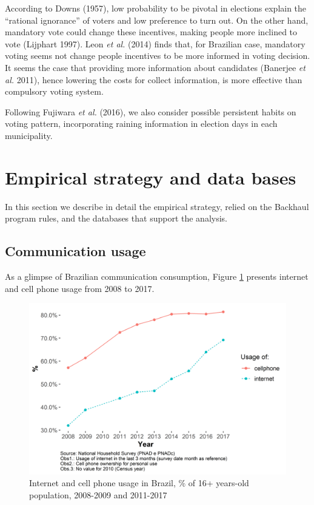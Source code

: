\documentclass[
  12pt,
]{article}
\begin{document}
According to Downs (1957), low probability to be pivotal in elections
explain the ``rational ignorance'' of voters and low preference to turn
out. On the other hand, mandatory vote could change these incentives,
making people more inclined to vote (Lijphart 1997). Leon \emph{et al.}
(2014) finds that, for Brazilian case, mandatory voting seems not change
people incentives to be more informed in voting decision. It seems the
case that providing more information about candidates (Banerjee \emph{et
al.} 2011), hence lowering the costs for collect information, is more
effective than compulsory voting system.

Following Fujiwara \emph{et al.} (2016), we also consider possible
persistent habits on voting pattern, incorporating raining information
in election days in each municipality.

\hypertarget{empirical-strategy-and-data-bases}{%
\section{Empirical strategy and data
bases}\label{empirical-strategy-and-data-bases}}

In this section we describe in detail the empirical strategy, relied on
the Backhaul program rules, and the databases that support the analysis.

\hypertarget{communication-usage}{%
\subsection{Communication usage}\label{communication-usage}}

As a glimpse of Brazilian communication consumption, Figure \ref{fig:0}
presents internet and cell phone usage from 2008 to 2017.

\begin{figure}
\centering
\includegraphics{artigo1_files/figure-latex/internet_usage-1.png}
\caption{Internet and cell phone usage in Brazil, \% of 16+ years-old
population, 2008-2009 and 2011-2017 \label{fig:0}}
\end{figure}
\end{document}
